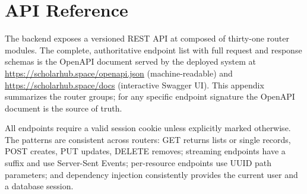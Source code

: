 \chapter{API Reference}
\label{app:api}

The \sh{} backend exposes a versioned REST API at  composed of thirty-one router modules. The complete, authoritative endpoint list with full request and response schemas is the OpenAPI document served by the deployed system at \url{https://scholarhub.space/openapi.json} (machine-readable) and \url{https://scholarhub.space/docs} (interactive Swagger UI). This appendix summarizes the router groups; for any specific endpoint signature the OpenAPI document is the source of truth.

All endpoints require a valid session cookie unless explicitly marked otherwise. The patterns are consistent across routers: GET returns lists or single records, POST creates, PUT updates, DELETE removes; streaming endpoints have a  suffix and use Server-Sent Events; per-resource endpoints use UUID path parameters; and dependency injection consistently provides the current user and a database session.

